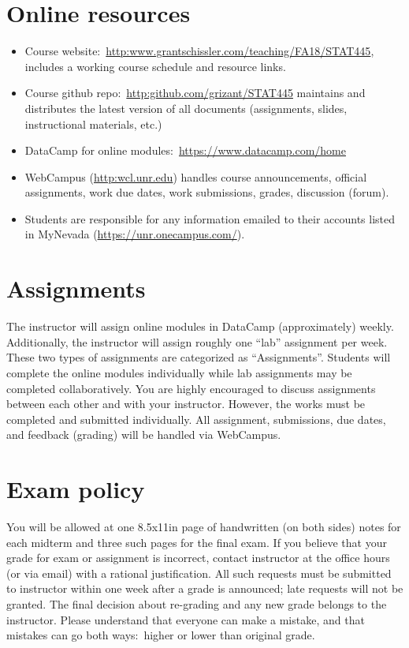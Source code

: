 \documentclass[11pt,onecolumn]{article}
\begin{document}
\section*{Online resources}
\begin{itemize}
    \itemsep0em
\item Course website:~\url{http:www.grantschissler.com/teaching/FA18/STAT445}, includes a working course schedule and resource links.
\item Course github repo:~\url{http:github.com/grizant/STAT445} maintains and distributes the latest version of all documents (assignments, slides, instructional materials, etc.)
  \item DataCamp for online modules:~\url{https://www.datacamp.com/home}
  \item WebCampus (\url{http:wcl.unr.edu}) handles course announcements, official assignments, work due dates, work submissions, grades, discussion (forum).
  \item Students are responsible for any information emailed to their accounts listed in MyNevada (\url{https://unr.onecampus.com/}).
\end{itemize}

\section*{Assignments}
The instructor will assign online modules in DataCamp (approximately) weekly. Additionally, the instructor will assign roughly one ``lab'' assignment per week. These two types of assignments are categorized as ``Assignments''. Students will complete the online modules individually while lab assignments may be completed collaboratively. You are highly encouraged to discuss assignments between each other and with your instructor. However, the works must be completed and submitted individually. All assignment, submissions, due dates, and feedback (grading) will be handled via WebCampus.

\section*{Exam policy} You will be allowed at one 8.5x11in page of handwritten (on both sides) notes for each midterm and three such pages for the final exam. If you believe that your grade for exam or assignment is incorrect, contact instructor at the office hours (or via email) with a rational justification. All such requests must be submitted to instructor within one week after a grade is announced; late requests will not be granted. The final decision about re-grading and any new grade belongs to the instructor. Please understand that everyone can make a mistake, and that mistakes can go both ways:~higher or lower than original grade.
\end{document}

